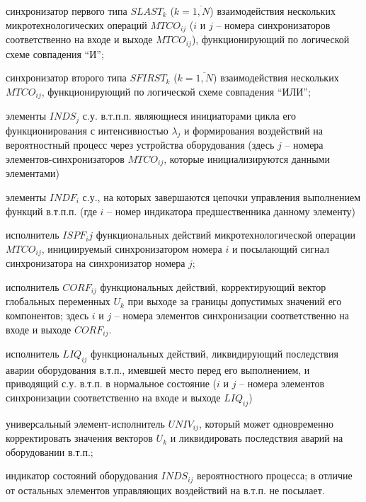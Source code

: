 \begin{textitemize}
    \item синхронизатор первого типа $SLAST_k$ ($k= \overline{1,N} $) взаимодействия нескольких микротехнологических операций $MTCO_{ij}$ ($i$ и $j$ – номера синхронизаторов соответственно на входе и выходе $MTCO_{ij}$), функционирующий по логической схеме совпадения ``И'';
    \item синхронизатор второго типа $SFIRST_k$ ($k= \overline{1,N} $) взаимодействия нескольких $MTCO_{ij}$, функционирующий по логической схеме совпадения ``ИЛИ'';
    \item элементы $INDS_j$ с.у. в.т.п.п. являющиеся инициаторами цикла его функционирования с интенсивностью $\lambda_j$ и формирования воздействий на вероятностный процесс через устройства оборудования (здесь $j$ – номера элементов-синхронизаторов $MTCO_{ij}$, которые инициализируются данными элементами)
    \item элементы $INDF_i$ с.у., на которых завершаются цепочки управления выполнением функций в.т.п.п. (где $i$ – номер индикатора предшественника данному элементу)
    \item исполнитель $ISPF_ij$ функциональных действий микротехнологической операции  $MTCO_{ij}$, инициируемый синхронизатором номера $i$ и посылающий сигнал синхронизатора на синхронизатор номера $j$;
    \item исполнитель $CORF_{ij}$ функциональных действий, корректирующий вектор глобальных переменных $U_k$ при выходе за границы допустимых значений его компонентов; здесь $i$ и $j$ – номера элементов синхронизации соответственно на входе и выходе $CORF_{ij}$.
    \item исполнитель $LIQ_{ij}$ функциональных действий, ликвидирующий последствия аварии оборудования в.т.п., имевшей место перед его выполнением, и приводящий с.у. в.т.п. в нормальное состояние ($i$ и $j$ – номера элементов синхронизации соответственно на входе и выходе $LIQ_{ij}$)
    \item универсальный элемент-исполнитель $UNIV_{ij}$, который может одновременно корректировать значения векторов $U_k$ и ликвидировать последствия аварий на оборудовании в.т.п.;
    \item индикатор состояний оборудования $INDS_{ij}$ вероятностного процесса; в отличие от остальных элементов управляющих воздействий на в.т.п. не посылает.
\end{textitemize}


